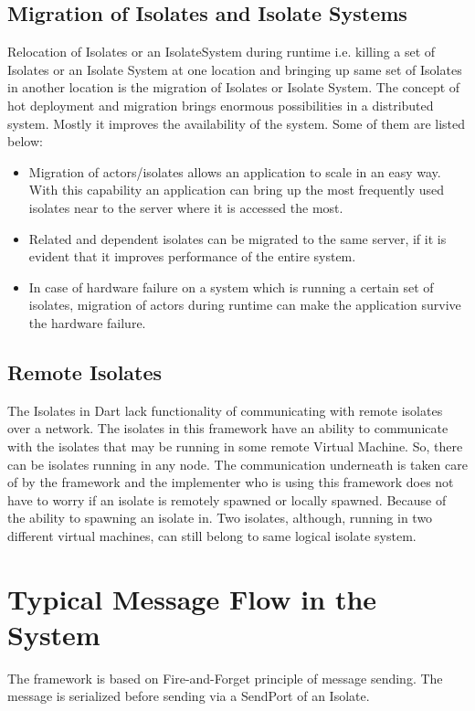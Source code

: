 \subsection{Migration of Isolates and Isolate Systems}
Relocation of Isolates or an IsolateSystem during runtime i.e. killing a set of Isolates or an Isolate System at one location and bringing up same set of Isolates in another location is the migration of Isolates or Isolate System. The concept of hot deployment and migration brings enormous possibilities in a distributed system. Mostly it improves the availability of the system. Some of them are listed below:
\begin{itemize}
  \item Migration of actors/isolates allows an application to scale in an easy way. With this capability an application can bring up the most frequently used isolates near to the server where it is accessed the most.
  \item Related and dependent isolates can be migrated to the same server, if it is evident that it improves performance of the entire system.
  \item In case of hardware failure on a system which is running a certain set of isolates, migration of actors during runtime can make the application survive the hardware failure.

\end{itemize}
\subsection{Remote Isolates}
The Isolates in Dart lack functionality of communicating with remote isolates over a network. The isolates in this framework have an ability to communicate with the isolates that may be running in some remote Virtual Machine. So, there can be isolates running in any node. The communication underneath is taken care of by the framework and the implementer who is using this framework does not have to worry if an isolate is remotely spawned or locally spawned.
Because of the ability to spawning an isolate in. Two isolates, although, running in two different virtual machines, can still belong to same logical isolate system.

\section{Typical Message Flow in the System}
The framework is based on Fire-and-Forget principle of message sending.
The message is serialized before sending via a SendPort of an Isolate.


